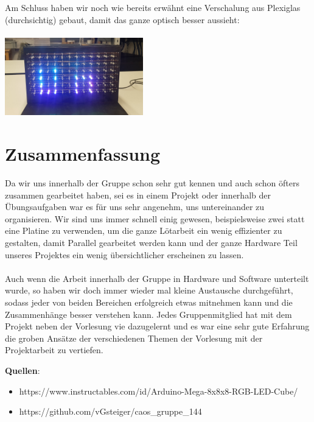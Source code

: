\documentclass[12pt,a4paper]{article}
\begin{document}
Am Schluss haben wir noch wie bereits erwähnt eine Verschalung aus Plexiglas (durchsichtig) gebaut, 
damit das ganze optisch besser aussieht: \\\\
\includegraphics[width=0.45\textwidth]{Endprod2.jpg}


\section{Zusammenfassung}

Da wir uns innerhalb der Gruppe schon sehr gut kennen und auch schon öfters zusammen gearbeitet haben, sei es in einem Projekt oder 
innerhalb der Übungsaufgaben war es für uns sehr angenehm, uns untereinander zu organisieren. Wir sind uns immer schnell einig gewesen,
beispielsweise zwei statt eine Platine zu verwenden, um die ganze Lötarbeit ein wenig effizienter zu gestalten, damit Parallel gearbeitet werden kann und
der ganze Hardware Teil unseres Projektes ein wenig übersichtlicher erscheinen zu lassen. \\\\
Auch wenn die Arbeit innerhalb der Gruppe in Hardware und Software unterteilt wurde, so haben wir doch immer wieder 
mal kleine Austausche durchgeführt, sodass jeder von beiden Bereichen erfolgreich etwas mitnehmen kann und die Zusammenhänge 
besser verstehen kann.
Jedes Gruppenmitglied hat mit dem Projekt neben der Vorlesung vie dazugelernt und es war eine sehr gute Erfahrung die groben Ansätze
der verschiedenen Themen der Vorlesung mit der Projektarbeit zu vertiefen.


\newpage

\textbf{Quellen}:

\begin{itemize}
    \item https://www.instructables.com/id/Arduino-Mega-8x8x8-RGB-LED-Cube/
    \item https://github.com/vGsteiger/caos\_gruppe\_144
\end{itemize}
\end{document}
